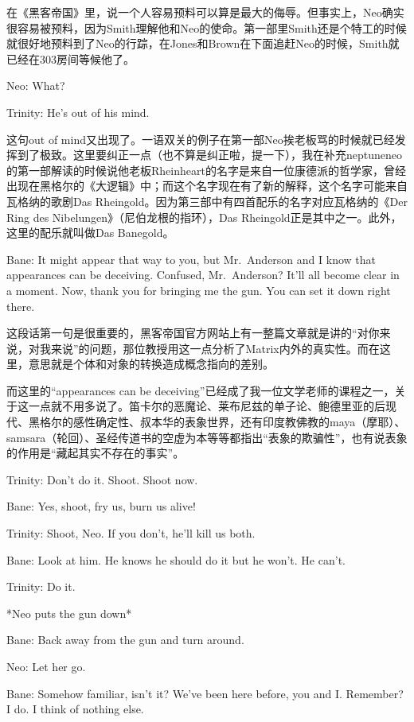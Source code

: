 \documentclass[UTF8]{ctexart}
\newenvironment{myquote}{\color{green} \setlength{\leftskip}{6em} \setlength{\rightskip}{4em} \setlength{\parindent}{-2em}}{\par}
\begin{document}
在《黑客帝国》里，说一个人容易预料可以算是最大的侮辱。但事实上，Neo确实很容易被预料，因为Smith理解他和Neo的使命。第一部里Smith还是个特工的时候就很好地预料到了Neo的行踪，在Jones和Brown在下面追赶Neo的时候，Smith就已经在303房间等候他了。

\begin{myquote}
Neo: What?

Trinity: He's out of his mind.
\end{myquote}

这句out of mind又出现了。一语双关的例子在第一部Neo挨老板骂的时候就已经发挥到了极致。这里要纠正一点（也不算是纠正啦，提一下），我在补充neptuneneo的第一部解读的时候说他老板Rheinheart的名字是来自一位康德派的哲学家，曾经出现在黑格尔的《大逻辑》中；而这个名字现在有了新的解释，这个名字可能来自瓦格纳的歌剧Das Rheingold。因为第三部中有四首配乐的名字对应瓦格纳的《Der Ring des Nibelungen》（尼伯龙根的指环），Das Rheingold正是其中之一。此外，这里的配乐就叫做Das Banegold。

\begin{myquote}
Bane: It might appear that way to you, but Mr.~Anderson and I know that appearances can be deceiving. Confused, Mr.~Anderson? It'll all become clear in a moment. Now, thank you for bringing me the gun. You can set it down right there.
\end{myquote}

这段话第一句是很重要的，黑客帝国官方网站上有一整篇文章就是讲的“对你来说，对我来说”的问题，那位教授用这一点分析了Matrix内外的真实性。而在这里，意思就是个体和对象的转换造成概念指向的差别。

而这里的“appearances can be deceiving”已经成了我一位文学老师的课程之一，关于这一点就不用多说了。笛卡尔的恶魔论、莱布尼兹的单子论、鲍德里亚的后现代、黑格尔的感性确定性、叔本华的表象世界，还有印度教佛教的maya（摩耶）、samsara（轮回）、圣经传道书的空虚为本等等都指出“表象的欺骗性”，也有说表象的作用是“藏起其实不存在的事实”。

\begin{myquote}
Trinity: Don't do it. Shoot. Shoot now.

Bane: Yes, shoot, fry us, burn us alive!

Trinity: Shoot, Neo. If you don't, he'll kill us both.

Bane: Look at him. He knows he should do it but he won't. He can't.

Trinity: Do it.

*Neo puts the gun down*

Bane: Back away from the gun and turn around.

Neo: Let her go.

Bane: Somehow familiar, isn't it? We've been here before, you and I. Remember? I do. I think of nothing else.
\end{myquote}
\end{document}

